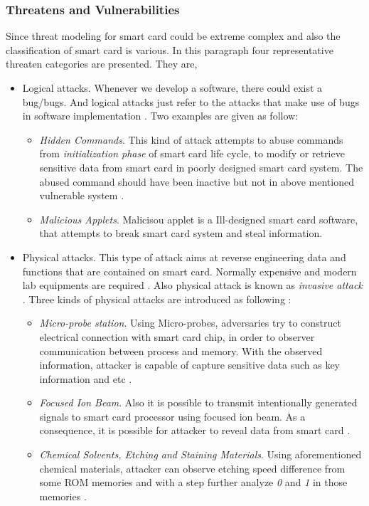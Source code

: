 \subsubsection{Threatens and Vulnerabilities}
Since threat modeling for smart card could be extreme complex and also the classification of smart card is various. In this paragraph four representative threaten categories are presented. They are,
\begin{itemize}
\item Logical attacks. Whenever we develop a software, there could exist a bug/bugs. And logical attacks just refer to the attacks that make use of bugs in software implementation \cite{smart_card_attack2}. Two examples are given as follow:
\begin{itemize}
\item \emph{Hidden Commands}. This kind of attack attempts to abuse commands from \emph{initialization phase} of smart card life cycle, to modify or retrieve sensitive data from smart card in poorly designed smart card system. The abused command should have been inactive but not in above mentioned vulnerable system \cite{smart_card_attack2}.
\item \emph{Malicious Applets}. Malicisou applet is a Ill-designed smart card software, that attempts to break smart card system and steal information.
\end{itemize}
\item Physical attacks. This type of attack aims  at reverse engineering data and functions that are contained on smart card. Normally expensive and modern lab equipments are required \cite{smart_card_attack2}. Also physical attack is known as \emph{invasive attack} \cite{smart_card_attack3}. Three kinds of physical attacks are introduced as following :
\begin{itemize} 
\item \emph{Micro-probe station}. Using Micro-probes, adversaries try to construct electrical connection with smart card chip, in order to observer communication between process and memory. With the observed information, attacker is capable of capture sensitive data such as key information and etc \cite{smart_card_attack3}.
\item \emph{Focused Ion Beam}. Also it is possible to transmit intentionally generated signals to smart card processor using focused ion beam. As a consequence, it is possible for attacker to reveal data from smart card \cite{smart_card_attack3}.
\item \emph{Chemical Solvents, Etching and Staining Materials}. Using aforementioned chemical materials, attacker can observe etching speed difference from some ROM memories and with a step further analyze \emph{0} and \emph{1} in those memories \cite{smart_card_attack2}.

\end{itemize}
\end{itemize}
